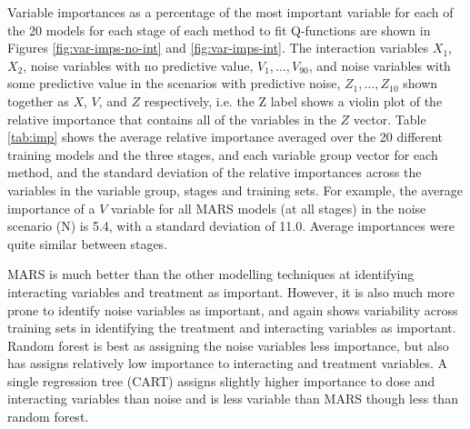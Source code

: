 \documentclass[12pt]{article}
\begin{document}
Variable importances as a percentage of the most important variable for each of the 20 models for each stage of each method to fit Q-functions are shown in Figures \ref{fig:var-imps-no-int} and \ref{fig:var-imps-int}. The interaction variables $X_{1}$, $X_{2}$, noise variables with no predictive value, $V_{1}, \ldots, V_{90}$, and noise variables with some predictive value in the scenarios with predictive noise, $Z_{1}, \ldots, Z_{10}$ shown together as $X$, $V$, and $Z$ respectively, i.e. the Z label shows a violin plot of the relative importance that contains all of the variables in the $Z$ vector. Table \ref{tab:imp} shows the average relative importance averaged over the 20 different training models and the three stages, and each variable group vector for each method, and the standard deviation of the relative importances across the variables in the variable group, stages and training sets. For example, the average importance of a $V$ variable for all MARS models (at all stages) in the noise scenario (N) is 5.4, with a standard deviation of 11.0. Average importances were quite similar between stages.

MARS is much better than the other modelling techniques at identifying interacting variables and treatment as important. However, it is also much more prone to identify noise variables as important, and again shows variability across training sets in identifying the treatment and interacting variables as important. Random forest is best as assigning the noise variables less importance, but also has assigns relatively low importance to interacting and treatment variables. A single regression tree (CART) assigns slightly higher importance to dose and interacting variables than noise and is less variable than MARS though less than random forest.
\end{document}

